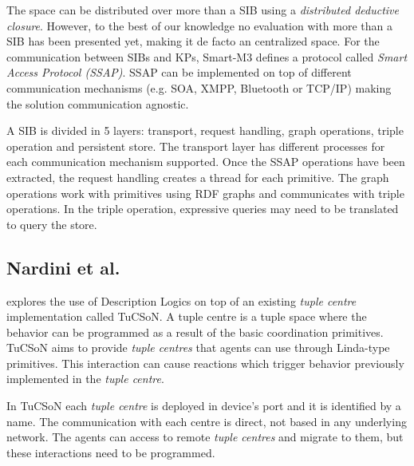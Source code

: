 The space can be distributed over more than a SIB using a \emph{distributed deductive closure}. %
However, to the best of our knowledge no evaluation with more than a SIB has been presented yet, making it de facto an centralized space.
For the communication between SIBs and KPs, Smart-M3 defines a protocol called \emph{Smart Access Protocol (SSAP)}.
SSAP can be implemented on top of different communication mechanisms (e.g. SOA, XMPP, Bluetooth or TCP/IP) making the solution communication agnostic. %


A SIB is divided in 5 layers: transport, request handling, graph operations, triple operation and persistent store.
The transport layer has different processes for each communication mechanism supported.
Once the SSAP operations have been extracted, the request handling creates a thread for each primitive.
The graph operations work with primitives using RDF graphs and communicates with triple operations.
In the triple operation, expressive queries may need to be translated to query the store.





\subsection{Nardini et al.}

\citet{nardini_semantic_2013} explores the use of Description Logics on top of an existing \emph{tuple centre} implementation called TuCSoN. %
A tuple centre is a tuple space where the behavior can be programmed as a result of the basic coordination primitives.
TuCSoN aims to provide \emph{tuple centres} that agents can use through Linda-type primitives.
This interaction can cause reactions which trigger behavior previously implemented in the \emph{tuple centre}.

In TuCSoN each \emph{tuple centre} is deployed in device's port and it is identified by a name.
The communication with each centre is direct, not based in any underlying network. %
The agents can access to remote \emph{tuple centres} and migrate to them, but these interactions need to be programmed.

